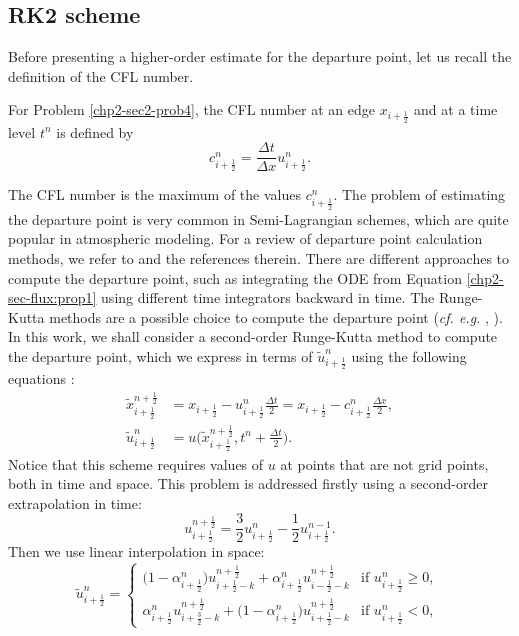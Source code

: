 \subsection{RK2 scheme}
Before presenting a higher-order estimate for the departure point,
let us recall the definition of the CFL number.
\begin{definition}
	\label{chp2-sec-flux:cfl}
	For Problem \ref{chp2-sec2-prob4}, the CFL number at an edge $x_{i+\frac{1}{2}}$ and at a time level $t^n$ is defined by
	\begin{equation}
		c^n_{i+\frac{1}{2}} = \frac{\Delta t}{\Delta x}u^n_{i+\frac{1}{2}}.
	\end{equation}
\end{definition}
The CFL number is the maximum of the values $c^n_{i+\frac{1}{2}}$.
The problem of estimating the departure point is very common in Semi-Lagrangian schemes, which are 
quite popular in atmospheric modeling. For a review of departure point calculation methods, we refer
to \citet[Chapter 3]{tumolo:2011} and the references therein. There are different approaches to compute
the departure point, such as integrating the ODE from Equation \ref{chp2-sec-flux:prop1} using different
time integrators \citep{durran:2011} backward in time. The Runge-Kutta methods are a possible choice to 
compute the departure point (\textit{cf. e.g.} \citet{guo:2014}, \citet{lu:2022}). In this work, we shall
consider a second-order Runge-Kutta method to compute the departure point, which we express in terms of
$\tilde{u}^n_{i+\frac{1}{2}}$ using the following equations \citep{durran:2010}:
\begin{align}
	\label{chp-sec-flux:dp_RK2}
	\tilde{x}_{i+\frac{1}{2}}^{n+\frac{1}{2}} &= x_{i+\frac{1}{2}} - u_{i+\frac{1}{2}}^n
	 \frac{\Delta t}{2} = x_{i+\frac{1}{2}} - c_{i+\frac{1}{2}}^n \frac{\Delta x}{2}, \nonumber \\
	\tilde{u}^n_{i+\frac{1}{2}} &= u\bigg(\tilde{x}^{n+\frac{1}{2}}_{i+\frac{1}{2}}, t^n + \frac{\Delta t}{2}\bigg).
\end{align}
Notice that this scheme requires values of $u$ at points that are not grid points,
both in time and space. This problem is addressed firstly using a second-order extrapolation in time:
\begin{equation}
	u^{n+\frac{1}{2}}_{i+\frac{1}{2}} = \frac{3}{2}u^{n}_{i+\frac{1}{2}}-\frac{1}{2}u^{n-1}_{i+\frac{1}{2}}.
\end{equation}
Then we use linear interpolation in space:
\begin{equation}
	\tilde{u}^n_{i+\frac{1}{2}} =
	\begin{cases}
		\big(1-\alpha_{i+\frac{1}{2}}^n \big)u^{n+\frac{1}{2}}_{i+\frac{1}{2}-k} +
        \alpha_{i+\frac{1}{2}}^n u^{n+\frac{1}{2}}_{i-\frac{1}{2}-k} & \text{if } {u}^n_{i+\frac{1}{2}}\geq 0,\\
		\alpha_{i+\frac{1}{2}}^n u^{n+\frac{1}{2}}_{i+\frac{3}{2}-k} + \big(1-\alpha_{i+\frac{1}{2}}^n\big)
        u^{n+\frac{1}{2}}_{i+\frac{1}{2}-k} & \text{if } {u}^n_{i+\frac{1}{2}} < 0,\
	\end{cases}
\end{equation}
